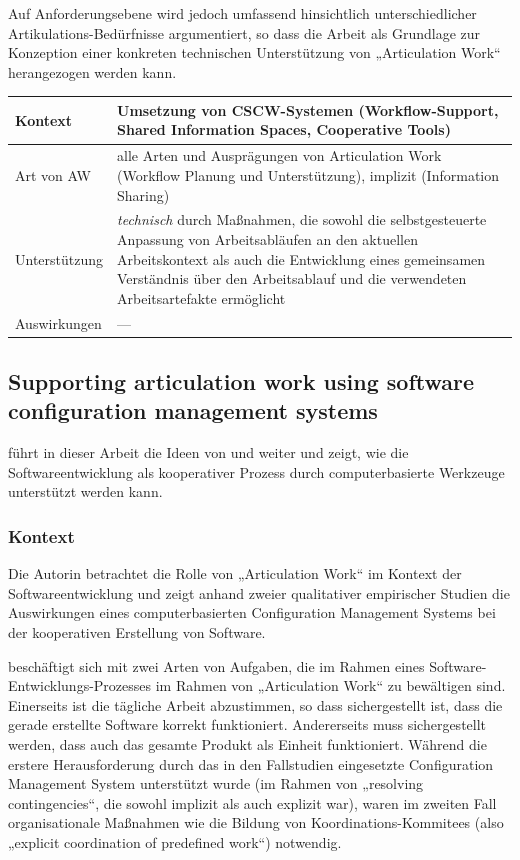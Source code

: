 Auf Anforderungsebene wird jedoch umfassend hinsichtlich unterschiedlicher Artikulations-Bedürfnisse argumentiert, so dass die Arbeit als Grundlage zur Konzeption einer konkreten technischen Unterstützung von „Articulation Work“ herangezogen werden kann.
\\[1em]
\begin{tabular}{| p{3cm} | p{10cm} |}
  \hline
  Kontext & Umsetzung von \gls{CSCW}-Systemen (Workflow-Support, Shared Information Spaces, Cooperative Tools)\\ \hline
  Art von AW & alle Arten und Ausprägungen von Articulation Work (Workflow Planung und Unterstützung), implizit (Information Sharing)\\ \hline
  Unterstützung & \emph{technisch} durch Maßnahmen, die sowohl die selbstgesteuerte Anpassung von Arbeitsabläufen an den aktuellen Arbeitskontext als auch die Entwicklung eines gemeinsamen Verständnis über den Arbeitsablauf und die verwendeten Arbeitsartefakte ermöglicht \\ \hline
  Auswirkungen & --- \\ \hline
\end{tabular}

\subsection{Supporting articulation work using software configuration management systems}
\label{sub:supporting_articulation_work_using_software_configuration_management_systems}

\citet{Grinter96} führt in dieser Arbeit die Ideen von \citet{Bendifallah87} und \citet{Schmidt92} weiter und zeigt, wie die Softwareentwicklung als kooperativer Prozess durch computerbasierte Werkzeuge unterstützt werden kann.

\subsubsection{Kontext}

Die Autorin betrachtet die Rolle von „Articulation Work“ im Kontext der Softwareentwicklung und zeigt anhand zweier qualitativer empirischer Studien die Auswirkungen eines computerbasierten Configuration Management Systems bei der kooperativen Erstellung von Software. 

\citeauthor{Grinter96} beschäftigt sich mit zwei Arten von Aufgaben, die im Rahmen eines Software-Entwicklungs-Prozesses im Rahmen von „Articulation Work“ zu bewältigen sind. Einerseits ist die tägliche Arbeit abzustimmen, so dass sichergestellt ist, dass die gerade erstellte Software korrekt funktioniert. Andererseits muss sichergestellt werden, dass auch das gesamte Produkt als Einheit funktioniert. Während die erstere Herausforderung durch das in den Fallstudien eingesetzte Configuration Management System unterstützt wurde (im Rahmen von „resolving contingencies“, die sowohl implizit als auch explizit war), waren im zweiten Fall organisationale Maßnahmen wie die Bildung von Koordinations-Kommitees (also „explicit coordination of predefined work“) notwendig. 

